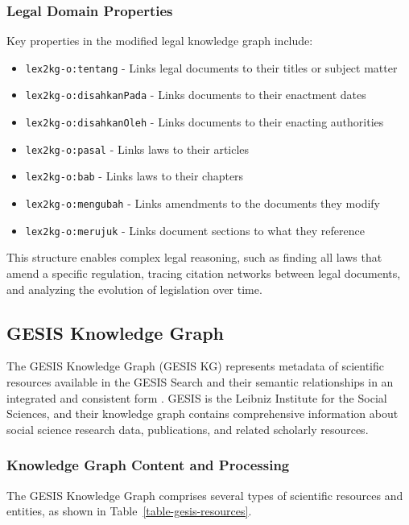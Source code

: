\subsubsection{Legal Domain Properties}
Key properties in the modified legal knowledge graph include:

\begin{itemize}
    \item \texttt{lex2kg-o:tentang} - Links legal documents to their titles or subject matter
    \item \texttt{lex2kg-o:disahkanPada} - Links documents to their enactment dates
    \item \texttt{lex2kg-o:disahkanOleh} - Links documents to their enacting authorities
    \item \texttt{lex2kg-o:pasal} - Links laws to their articles
    \item \texttt{lex2kg-o:bab} - Links laws to their chapters
    \item \texttt{lex2kg-o:mengubah} - Links amendments to the documents they modify
    \item \texttt{lex2kg-o:merujuk} - Links document sections to what they reference
\end{itemize}

This structure enables complex legal reasoning, such as finding all laws that amend a specific regulation, tracing citation networks between legal documents, and analyzing the evolution of legislation over time.

\vspace{0.5cm}
\subsection{GESIS Knowledge Graph}
\label{gesis-kg}

The GESIS Knowledge Graph (GESIS KG) represents metadata of scientific resources available in the GESIS Search and their semantic relationships in an integrated and consistent form \citep{biswas2025gesis}. GESIS is the Leibniz Institute for the Social Sciences, and their knowledge graph contains comprehensive information about social science research data, publications, and related scholarly resources.

\subsubsection{Knowledge Graph Content and Processing}
The GESIS Knowledge Graph comprises several types of scientific resources and entities, as shown in Table~\ref{table-gesis-resources}.

